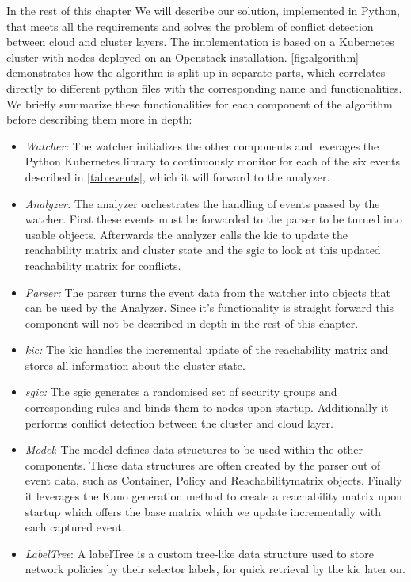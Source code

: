 In the rest of this chapter We will describe our solution, implemented in Python, that meets all the requirements and solves the problem of conflict detection between cloud and cluster layers. The implementation is based on a Kubernetes cluster with nodes deployed on an Openstack installation. \autoref{fig:algorithm} demonstrates how the algorithm is split up in separate parts, which correlates directly to different python files with the corresponding name and functionalities. We briefly summarize these functionalities for each component of the algorithm before describing them more in depth:
\begin{itemize}
    \renewcommand{\labelitemi}{\scriptsize$\blacksquare$}
    \item \textit{Watcher:} The watcher initializes the other components and leverages the Python Kubernetes library to continuously monitor for each of the six events described in \autoref{tab:events}, which it will forward to the analyzer.
    \item \textit{Analyzer:} The analyzer orchestrates the handling of events passed by the watcher. First these events must be forwarded to the parser to be turned into usable objects. Afterwards the analyzer calls the \acrshort{kic} to update the reachability matrix and cluster state and the \acrshort{sgic} to look at this updated reachability matrix for conflicts.
    \item \textit{Parser:} The parser turns the event data from the watcher into objects that can be used by the Analyzer. Since it's functionality is straight forward this component will not be described in depth in the rest of this chapter.
    \item \textit{\acrfull{kic}:} The \acrshort{kic} handles the incremental update of the reachability matrix and stores all information about the cluster state.
    \item \textit{\acrfull{sgic}:} The \acrshort{sgic} generates a randomised set of security groups and corresponding rules and binds them to nodes upon startup. Additionally it performs conflict detection between the cluster and cloud layer.
    \item  \textit{Model}: The model defines data structures to be used within the other components. These data structures are often created by the parser out of event data, such as Container, Policy and Reachabilitymatrix objects. Finally it leverages the Kano generation method to create a reachability matrix upon startup which offers the base matrix which we update incrementally with each captured event.
    \item  \textit{LabelTree}: A labelTree is a custom tree-like data structure used to store network policies by their selector labels, for quick retrieval by the \acrshort{kic} later on.
\end{itemize}
